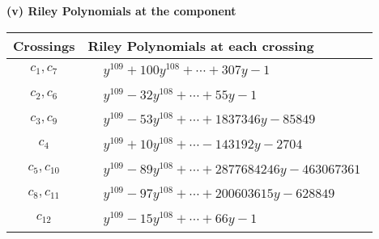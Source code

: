 \documentclass[1p]{elsarticle_modified}
\theoremstyle{definition}
\begin{document}
\flushleft \textbf{(v) Riley Polynomials at the component}\newline \\
\begin{tabular}{m{50pt}|m{274pt}}
Crossings & \hspace{64pt}Riley Polynomials at each crossing \\
\hline $$\begin{aligned}c_{1},c_{7}\end{aligned}$$&$\begin{aligned}
&y^{109}+100 y^{108}+\cdots+307 y-1
\end{aligned}$\\
\hline $$\begin{aligned}c_{2},c_{6}\end{aligned}$$&$\begin{aligned}
&y^{109}-32 y^{108}+\cdots+55 y-1
\end{aligned}$\\
\hline $$\begin{aligned}c_{3},c_{9}\end{aligned}$$&$\begin{aligned}
&y^{109}-53 y^{108}+\cdots+1837346 y-85849
\end{aligned}$\\
\hline $$\begin{aligned}c_{4}\end{aligned}$$&$\begin{aligned}
&y^{109}+10 y^{108}+\cdots-143192 y-2704
\end{aligned}$\\
\hline $$\begin{aligned}c_{5},c_{10}\end{aligned}$$&$\begin{aligned}
&y^{109}-89 y^{108}+\cdots+2877684246 y-463067361
\end{aligned}$\\
\hline $$\begin{aligned}c_{8},c_{11}\end{aligned}$$&$\begin{aligned}
&y^{109}-97 y^{108}+\cdots+200603615 y-628849
\end{aligned}$\\
\hline $$\begin{aligned}c_{12}\end{aligned}$$&$\begin{aligned}
&y^{109}-15 y^{108}+\cdots+66 y-1
\end{aligned}$\\
\hline
\end{tabular}\\~\\
\end{document}
